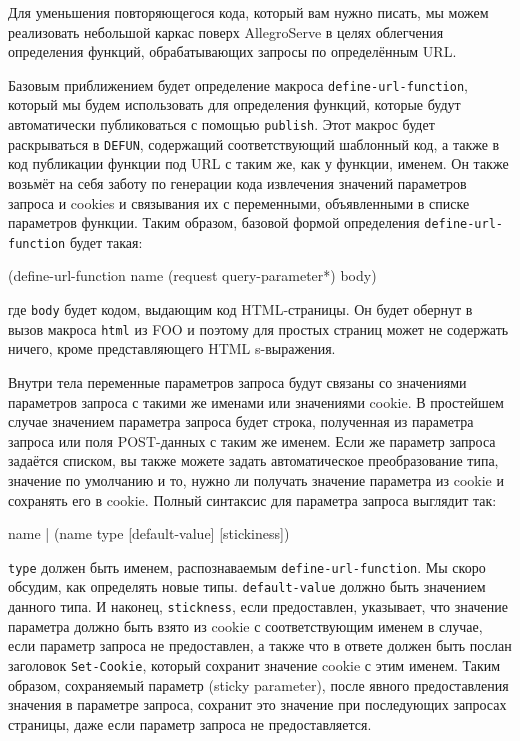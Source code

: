 Для уменьшения повторяющегося кода, который вам нужно писать, мы можем реализовать
небольшой каркас поверх AllegroServe в целях облегчения определения функций,
обрабатывающих запросы по определённым URL.

Базовым приближением будет определение макроса \lstinline{define-url-function}, который мы будем
использовать для определения функций, которые будут автоматически публиковаться с помощью
\lstinline{publish}. Этот макрос будет раскрываться в \lstinline{DEFUN}, содержащий
соответствующий шаблонный код, а также в код публикации функции под URL с таким же, как у
функции, именем. Он также возьмёт на себя заботу по генерации кода извлечения значений
параметров запроса и cookies и связывания их с переменными, объявленными в списке
параметров функции. Таким образом, базовой формой определения \lstinline{define-url-function}
будет такая:

\begin{myverb}
(define-url-function name (request query-parameter*)
  body)
\end{myverb}

\noindent{}где \lstinline{body} будет кодом, выдающим код HTML-страницы. Он будет обернут в вызов макроса
\lstinline{html} из FOO и поэтому для простых страниц может не содержать ничего, кроме
представляющего HTML s-выражения.

Внутри тела переменные параметров запроса будут связаны со значениями параметров запроса с
такими же именами или значениями cookie. В простейшем случае значением параметра запроса
будет строка, полученная из параметра запроса или поля POST-данных с таким же именем. Если
же параметр запроса задаётся списком, вы также можете задать автоматическое преобразование
типа, значение по умолчанию и то, нужно ли получать значение параметра из cookie и сохранять его
в cookie. Полный синтаксис для параметра запроса выглядит так:

\begin{myverb}
name | (name type [default-value] [stickiness])
\end{myverb}

\lstinline{type} должен быть именем, распознаваемым \lstinline{define-url-function}. Мы скоро
обсудим, как определять новые типы. \lstinline{default-value} должно быть значением данного
типа. И наконец, \lstinline{stickness}, если предоставлен, указывает, что значение параметра
должно быть взято из cookie с соответствующим именем в случае, если параметр запроса не
предоставлен, а также что в ответе должен быть послан заголовок \lstinline{Set-Cookie}, который
сохранит значение cookie с этим именем. Таким образом, сохраняемый параметр (sticky
parameter), после явного предоставления значения в параметре запроса, сохранит это
значение при последующих запросах страницы, даже если параметр запроса не предоставляется.

